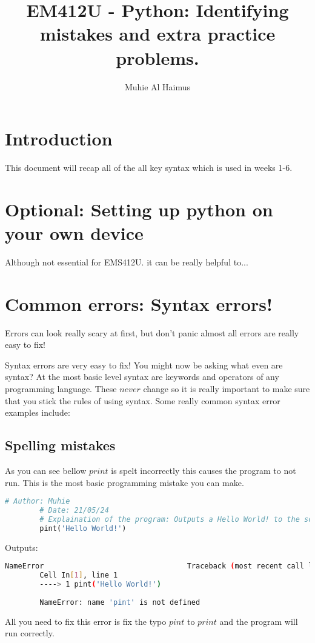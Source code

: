 \documentclass{article}
\title{EM412U - Python: Identifying mistakes and extra practice problems.}
\author{Muhie Al Haimus}
\begin{document}
	\maketitle
	\section{Introduction}
	This document will recap all of the all key syntax which is used in weeks 1-6.
	
	\section{Optional: Setting up python on your own device}
	Although not essential for EMS412U. it can be really helpful to...
	\section{Common errors: Syntax errors!}
	Errors can look really scary at first, but don't panic almost all errors are really easy to fix!
	
	Syntax errors are very easy to fix! You might now be asking what even are syntax? At the most basic level syntax are keywords and operators of any programming language. These $never$ change so it is really important to make sure that you stick the rules of using syntax. Some really common syntax error examples include:
	
	\subsection{Spelling mistakes}
	As you can see bellow $print$ is spelt incorrectly this causes the program to not run. This is the most basic programming mistake you can make.
	\begin{lstlisting}[language=Python]
		# Author: Muhie
		# Date: 21/05/24
		# Explaination of the program: Outputs a Hello World! to the screen
		pint('Hello World!')
	\end{lstlisting}
	Outputs:
	\begin{lstlisting}[language=Bash]
		NameError                                 Traceback (most recent call last)
		Cell In[1], line 1
		----> 1 pint('Hello World!')
		
		NameError: name 'pint' is not defined
	\end{lstlisting}
	All you need to fix this error is fix the typo $pint$ to $print$ and the program will run correctly.
\end{document}
